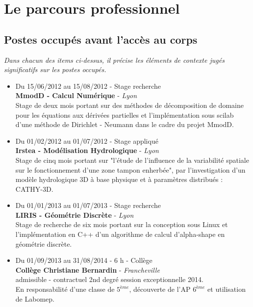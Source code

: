 \documentclass[11pt]{article}
\begin{document}
\section{Le parcours professionnel}

\subsection{Postes occupés avant l’accès au corps}

\textit{Dans chacun des items ci-­dessus, il précise les éléments de contexte jugés significatifs sur les postes occupés.} \\

\begin{itemize}

  \item Du 15/06/2012 au 15/08/2012 - Stage recherche\\
  \textbf{MmodD - Calcul Numérique} - \textit{Lyon} \\
    Stage de deux mois portant sur des méthodes de décomposition de domaine pour les équations aux dérivées partielles et l'implémentation sous scilab d'une méthode de Dirichlet - Neumann dans le cadre du projet MmodD.

  \item Du 01/02/2012 au 01/07/2012 - Stage appliqué\\
  \textbf{Irstea - Modélisation Hydrologique} - \textit{Lyon} \\
    Stage de cinq mois portant sur "l’étude de l’influence de la variabilité spatiale sur le fonctionnement d’une zone tampon enherbée", par l’investigation d’un modèle hydrologique 3D à base physique et à paramètres distribués :   CATHY-3D.

  \item Du 01/01/2013 au 01/07/2013 - Stage recherche\\
  \textbf{LIRIS - Géométrie Discrète} - \textit{Lyon} \\
    Stage de recherche de six mois portant sur la conception sous Linux et l’implémentation en C++ d’un algorithme de calcul d’alpha-shape en géométrie discrète. 

  \item Du 01/09/2013 au 31/08/2014 - 6 h - Collège\\
    \textbf{Collège Christiane Bernardin} - \textit{Francheville}\\
    admissible - contractuel 2nd degré session exceptionnelle 2014. \\
    En responsabilité d'une classe de $5^{ème}$, découverte de l'AP $6^{ème}$ et utilisation de Labomep.
\end{itemize}
\end{document}
